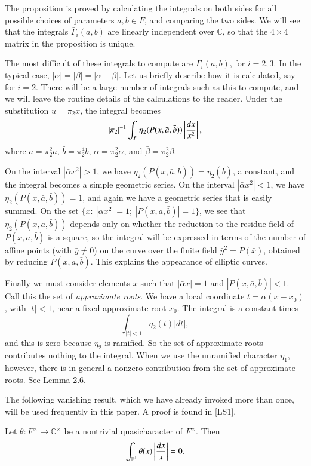 \documentclass{amsart}
\newcommand\bP{{\mathbb P}}
\newcommand\C{{\mathbb C}}
\newcommand\leftd[1]{\left | {d#1\over #1^2}\right |}
\newcommand\leftdx{\leftd x}
\newcommand\bGamma{\bar\Gamma}
\newenvironment{cthm}[1]
  {\renewcommand\thethm{\bf #1}\thm}
  {\endthm}
\begin{document}
The proposition is
proved by calculating the integrals on both sides for all possible
choices of parameters $a,b\in F$, and comparing the two sides.
We will see that the integrals $\bGamma_i(a,b)$ are linearly
independent over ${\mathbb C}$, so that the $4\times4$ matrix in
the proposition is unique.

The most difficult of these integrals to compute are $\Gamma_i(a,b)$,
for $i=2,3$.  In the typical case, $|\alpha|=|\beta|=|\alpha-\beta|$.
Let us briefly describe how it is calculated, say for $i=2$.  There
will be a large number of integrals such as this to compute, and
we will leave the routine details of the calculations to the reader.
Under the substitution $u=\pi_2x$, the
integral becomes
$$|\pi_2|^{-1}\int_{F}\eta_2(P(x,\bar a,\bar b))\leftdx,$$
where $\bar a = \pi_2^{2} a$, $\bar b = \pi_2^{4} b$, $\bar \alpha
=\pi_2^{2} \alpha$, and $\bar \beta = \pi_2^{2}\beta$.

On the interval
$|\bar\alpha x^2| >1$, we have $\eta_2(P(x,\bar a,\bar b)) 
        = \eta_2(\bar b)$, a constant,
and the integral becomes a simple geometric series.
On the interval $|\bar\alpha x^2| <1$, we have $\eta_2(P(x,\bar a,\bar b)) = 1$,
and again we have a geometric series that is easily summed.
On the set $\{x: \ |\bar \alpha x^2| = 1; \ |P(x,\bar a,\bar b)| = 1\}$,
we see that $\eta_2(P(x,\bar a,\bar b))$ depends only on whether the
reduction to the residue field of $P(x,\bar a,\bar b)$ is a square,
so the integral will be expressed in
terms of the number of affine
points (with $\bar y\ne 0$) 
on the curve over the finite field $\bar y^2 = \bar P(\bar x)$,
obtained by reducing $P(x,\bar a,\bar b)$.  
This explains the appearance of 
elliptic curves.  

Finally we must consider elements $x$
such that $|\bar \alpha x| = 1$ and $|P(x,\bar a,\bar b)|<1$.
Call this the set of {\it approximate roots}.
We have a local coordinate $t = \bar \alpha(x-x_0)$, with $|t|<1$,
near a fixed approximate root $x_0$.  The integral is a constant times
$$\int_{|t|<1} \eta_2(t)|dt|,$$
and this is zero because $\eta_2$ is ramified.  So the set of
approximate roots contributes nothing to the integral.  When
we use the unramified character $\eta_1$, however, there is in
general a nonzero contribution from the set of approximate roots.
See Lemma 2.6.

The following vanishing result, which we have already invoked
more than once, will be used frequently in this paper.  A proof
is found in [LS1].

\bigskip
\noindent
\begin{cthm}{Lemma 2.2} Let $\theta:F^\times\to \C^\times$ be a
nontrivial quasicharacter of $F^\times$.  Then
$$\int_{\bP^1} \theta(x) \left | {dx\over x}\right | =0.$$
\end{cthm}
\end{document}
